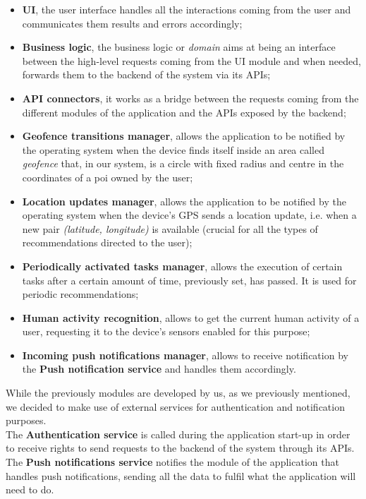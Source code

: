 \documentclass[../../main]{subfiles}
\begin{document}
\begin{itemize}
    \item \textbf{UI}, the user interface handles all the interactions coming from the user and communicates them results and errors accordingly;
    \item \textbf{Business logic}, the business logic or \textit{domain} aims at being an interface between the high-level requests coming from the UI module and when needed, forwards them to the backend of the system via its APIs;
    \item \textbf{API connectors}, it works as a bridge between the requests coming from the different modules of the application and the APIs exposed by the backend;
    \item \textbf{Geofence transitions manager}, allows the application to be notified by the operating system when the device finds itself inside an area called \textit{geofence} that, in our system, is a circle with fixed radius and centre in the coordinates of a poi owned by the user;
    \item \textbf{Location updates manager}, allows the application to be notified by the operating system when the device's GPS sends a location update, i.e. when a new pair \textit{(latitude, longitude)} is available (crucial for all the types of recommendations directed to the user);
    \item \textbf{Periodically activated tasks manager}, allows the execution of certain tasks after a certain amount of time, previously set, has passed. It is used for periodic recommendations;
    \item \textbf{Human activity recognition}, allows to get the current human activity of a user, requesting it to the device's sensors enabled for this purpose;
    \item \textbf{Incoming push notifications manager}, allows to receive notification by the \textbf{Push notification service} and handles them accordingly.
\end{itemize}
While the previously modules are developed by us, as we previously mentioned, we decided to make use of external services for authentication and notification purposes.\\
The \textbf{Authentication service} is called during the application start-up in order to receive rights to send requests to the backend of the system through its APIs.
The \textbf{Push notifications service} notifies the module of the application that handles push notifications, sending all the data to fulfil what the application will need to do.
\end{document}
